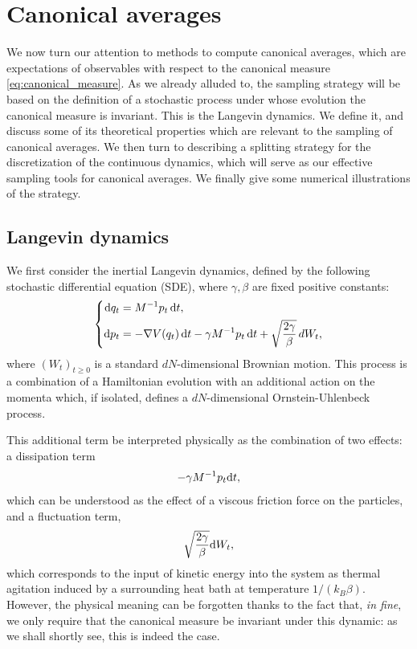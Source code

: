 \section{Canonical averages}
We now turn our attention to methods to compute canonical averages, which are expectations of observables with respect to the canonical measure \eqref{eq:canonical_measure}.
As we already alluded to, the sampling strategy will be based on the definition of a stochastic process under whose evolution the canonical measure is invariant. This is the Langevin dynamics.
We define it, and discuss some of its theoretical properties which are relevant to the sampling of canonical averages.
We then turn to describing a splitting strategy for the discretization of the continuous dynamics, which will serve as our effective sampling tools for canonical averages.
We finally give some numerical illustrations of the strategy.
\subsection{Langevin dynamics}
We first consider the inertial Langevin dynamics, defined by the following stochastic differential equation (SDE), where $\gamma, \beta$ are fixed positive constants:
\begin{equation}
    \label{eq:langevin}
    \left\{\begin{aligned}
        \text dq_t&=M^{-1}p_t\,\mathrm{d}t,\\
        \text dp_t&= -\nabla V(q_t)\,\mathrm{d}t -\gamma M^{-1}p_t\,\mathrm{d}t+\sqrt{\frac{2\gamma}\beta}\text \,dW_t,
    \end{aligned}\right.
\end{equation}
where $(W_t)_{t\geq 0}$ is a standard $dN$-dimensional Brownian motion.
This process is a combination of a Hamiltonian evolution with an additional action on the momenta which, if isolated, defines a $dN$-dimensional Ornstein-Uhlenbeck process.

This additional term be interpreted physically as the combination of two effects: a dissipation term 
$$-\gamma M^{-1}p_t\mathrm{d}t,$$
which can be understood as the effect of a viscous friction force on the particles, and a fluctuation term, 
$$\sqrt{\frac{2\gamma}\beta}\text dW_t,$$
which corresponds to the input of kinetic energy into the system as thermal agitation induced by a surrounding heat bath at temperature $1/(k_B\beta)$.\\

However, the physical meaning can be forgotten thanks to the fact that, \textit{in fine}, we only require that the canonical measure be invariant under this dynamic: as we shall shortly see, this is indeed the case.


